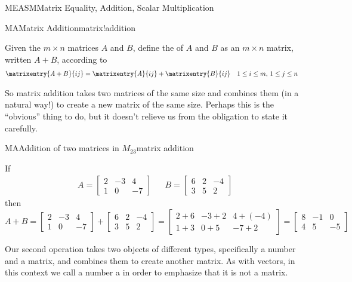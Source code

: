 \begin{subsect}{MEASM}{Matrix Equality, Addition, Scalar Multiplication}
%
\begin{definition}{MA}{Matrix Addition}{matrix!addition}
\begin{para}Given the $m\times n$ matrices  $A$ and $B$, define the  of $A$ and $B$ as an $m\times n$ matrix, written $A+B$, according to
%
\begin{align*}
\matrixentry{A+B}{ij}&=\matrixentry{A}{ij}+\matrixentry{B}{ij}
&&1\leq i\leq m,\,1\leq j\leq n
\end{align*}
\end{para}
%
\end{definition}
%
\begin{para}So matrix addition takes two matrices of the same size and combines them (in a natural way!) to create a new matrix of the same size.  Perhaps this is the ``obvious'' thing to do, but it doesn't relieve us from the obligation to state it carefully.\end{para}
%
\begin{example}{MA}{Addition of two matrices in $M_{23}$}{matrix addition}
\begin{para}If
%
\begin{align*}
A=
\begin{bmatrix}
2&-3&4\\
1&0&-7
\end{bmatrix}
&&
B=
\begin{bmatrix}
6&2&-4\\
3&5&2
\end{bmatrix}
\end{align*}
%
then
%
\begin{equation*}
A+B=
\begin{bmatrix}
2&-3&4\\
1&0&-7
\end{bmatrix}
+
\begin{bmatrix}
6&2&-4\\
3&5&2
\end{bmatrix}
=
\begin{bmatrix}
2+6&-3+2&4+(-4)\\
1+3&0+5&-7+2
\end{bmatrix}
=\begin{bmatrix}
8&-1&0\\
4&5&-5
\end{bmatrix}
\end{equation*}
\end{para}
%
\end{example}
%
\begin{para}Our second operation takes two objects of different types, specifically a number and a matrix, and combines them to create another matrix.  As with vectors, in this context we call a number a  in order to emphasize that it is not a matrix.\end{para}

\end{subsect}
